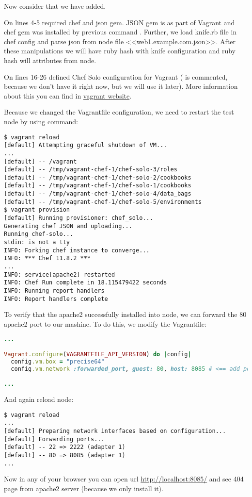 Now consider that we have added.

On lines 4-5 required chef and json gem. JSON gem is as part of Vagrant and chef gem was installed by previous command . Further, we load knife.rb file in chef config and parse json from node file <<web1.example.com.json>>. After these manipulations we will have  ruby hash with knife configuration and  ruby hash will attributes from node.

On lines 16-26 defined Chef Solo configuration for Vagrant ( is commented, because we don't have it right now, but we will use it later). More information about this you can find in \href{http://docs.vagrantup.com/v2/provisioning/chef\_solo.html}{vagrant website}.

Because we changed the Vagrantfile configuration, we need to restart the test node by using  command:

\begin{lstlisting}[label=lst:my-cloud-vagrant8]
$ vagrant reload
[default] Attempting graceful shutdown of VM...
...
[default] -- /vagrant
[default] -- /tmp/vagrant-chef-1/chef-solo-3/roles
[default] -- /tmp/vagrant-chef-1/chef-solo-2/cookbooks
[default] -- /tmp/vagrant-chef-1/chef-solo-1/cookbooks
[default] -- /tmp/vagrant-chef-1/chef-solo-4/data_bags
[default] -- /tmp/vagrant-chef-1/chef-solo-5/environments
$ vagrant provision
[default] Running provisioner: chef_solo...
Generating chef JSON and uploading...
Running chef-solo...
stdin: is not a tty
INFO: Forking chef instance to converge...
INFO: *** Chef 11.8.2 ***
...
INFO: service[apache2] restarted
INFO: Chef Run complete in 18.115479422 seconds
INFO: Running report handlers
INFO: Report handlers complete
\end{lstlisting}

To verify that the apache2 successfully installed into node, we can forward the 80 apache2 port to our mashine. To do this, we modify the Vagrantfile:

\begin{lstlisting}[language=Ruby, label=lst:my-cloud-vagrant9,title=my-cloud/nodes/Vagrantfile]
...

Vagrant.configure(VAGRANTFILE_API_VERSION) do |config|
  config.vm.box = "precise64"
  config.vm.network :forwarded_port, guest: 80, host: 8085 # <== add port forwarding

...
\end{lstlisting}

And again reload node:

\begin{lstlisting}[label=lst:my-cloud-vagrant10]
$ vagrant reload
...
[default] Preparing network interfaces based on configuration...
[default] Forwarding ports...
[default] -- 22 => 2222 (adapter 1)
[default] -- 80 => 8085 (adapter 1)
...
\end{lstlisting}

Now in any of your browser you can open url \href{http://localhost:8085/}{http://localhost:8085/} and see 404 page from apache2 server (because we only install it).

